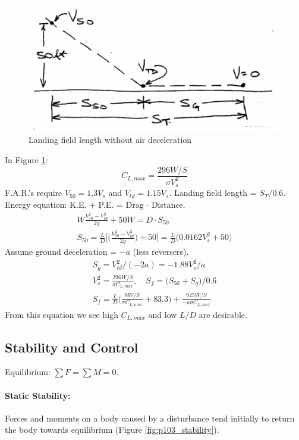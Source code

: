 \documentclass[draft=false, titlepage]{article}
\begin{document}
\begin{figure}[ht]
	\centering
	\includegraphics[width=0.8\linewidth]{Figures/p102_landing.PNG}
	\caption{Landing field length without air deceleration}
	\label{fig:p102_landing}
\end{figure}
In Figure \ref{fig:p102_landing}:
\begin{equation*}
C_{L,max} = \frac{296W/S}{\sigma V_s^2}
\end{equation*}
F.A.R.'s require $V_{50} = 1.3V_s$ and $V_{td} = 1.15V_s$. Landing field length = $S_T/0.6$.\\
Energy equation: K.E. + P.E. = Drag $\cdot$ Distance.
\begin{gather*}
W\frac{V_{50}^2-V_{td}^2}{2g} + 50W = D\cdot S_{50}\\
S_{50} = \frac{L}{D} \Big[ \Big( \frac{V_{50}^2-V_{td}^2}{2g} \Big) + 50 \Big] = \frac{L}{D} \big(0.0162V_s^2 + 50\big)
\end{gather*}
Assume ground deceleration = $-a$ (less reversers).
\begin{gather*}
S_g = V_{td}^2/(-2a) = -1.88V_s^2/a\\
V_s^2 = \frac{296W/S}{\sigma C_{L,max}},\quad S_f = \big(S_{50}+S_g\big)/0.6\\
\boxed{ S_f = \frac{L}{D} \Big( \frac{8W/S}{\sigma C_{L,max}} + 83.3 \Big) + \frac{925W/S}{-a\sigma C_{L,max}}}
\end{gather*}
From this equation we see high $C_{L,max}$ and low $L/D$ are desirable.

\subsection{Stability and Control}
Equilibrium: $\sum F = \sum M = 0$.
\paragraph*{Static Stability:} Forces and moments on a body caused by a disturbance tend initially to return the body towards equilibrium (Figure \ref{fig:p103_stability}).
\end{document}
